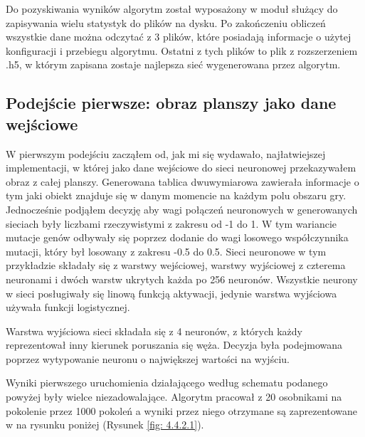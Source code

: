 \documentclass[12pt, oneside, a4paper]{report}
\begin{document}
Do pozyskiwania wyników algorytm został wyposażony w moduł służący do zapisywania wielu statystyk do plików na dysku. Po zakończeniu obliczeń wszystkie dane można odczytać z 3 plików, które posiadają informacje o użytej konfiguracji i przebiegu algorytmu. Ostatni z tych plików to plik z rozszerzeniem .h5, w którym zapisana zostaje najlepsza sieć wygenerowana przez algorytm.

\subsection{Podejście pierwsze: obraz planszy jako dane wejściowe}

W pierwszym podejściu zacząłem od, jak mi się wydawało, najłatwiejszej implementacji, w której jako dane wejściowe do sieci neuronowej przekazywałem obraz z całej planszy. Generowana tablica dwuwymiarowa zawierała informacje o tym jaki obiekt znajduje się w danym momencie na każdym polu obszaru gry. Jednocześnie podjąłem decyzję aby wagi połączeń neuronowych w generowanych sieciach były liczbami rzeczywistymi z zakresu od -1 do 1. W tym wariancie mutacje genów odbywały się poprzez dodanie do wagi losowego współczynnika mutacji, który był losowany z zakresu -0.5 do 0.5. Sieci neuronowe w tym przykładzie składały się z warstwy wejściowej, warstwy wyjściowej z czterema neuronami i dwóch warstw ukrytych każda po 256 neuronów. Wszystkie neurony w sieci posługiwały się linową funkcją aktywacji, jedynie warstwa wyjściowa używała funkcji logistycznej.

Warstwa wyjściowa sieci składała się z 4 neuronów, z których każdy reprezentował inny kierunek poruszania się węża. Decyzja była podejmowana poprzez wytypowanie neuronu o największej wartości na wyjściu.

Wyniki pierwszego uruchomienia działającego według schematu podanego powyżej były wielce niezadowalające.
Algorytm pracował z 20 osobnikami na pokolenie przez 1000 pokoleń a wyniki przez niego otrzymane są zaprezentowane w na rysunku poniżej (Rysunek \ref{fig: 4.4.2.1}).
\end{document}
